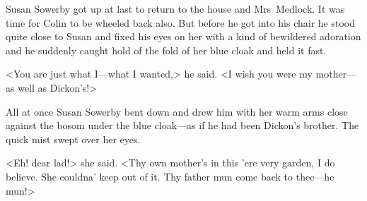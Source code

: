Susan Sowerby got up at last to return to the house and Mrs~Medlock. It was time for Colin to be wheeled back also. But before he got into his chair he stood quite close to Susan and fixed his eyes on her with a kind of bewildered adoration and he suddenly caught hold of the fold of her blue cloak and held it fast.

<You are just what I—what I wanted,> he said. <I wish you were my mother—as well as Dickon's!>

All at once Susan Sowerby bent down and drew him with her warm arms close against the bosom under the blue cloak—as if he had been Dickon's brother. The quick mist swept over her eyes.

<Eh! dear lad!> she said. <Thy own mother's in this 'ere very garden, I do believe. She couldna' keep out of it. Thy father mun come back to thee—he mun!>